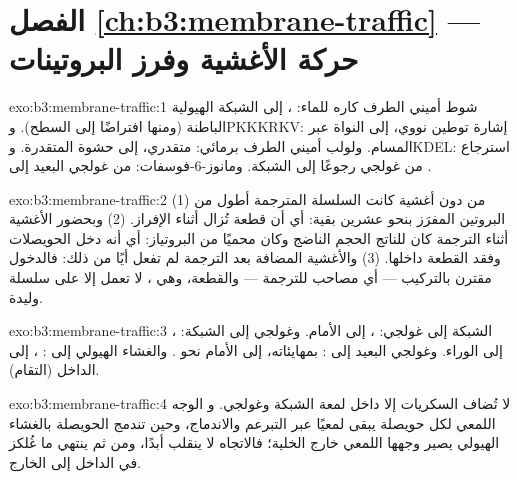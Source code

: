 \section*{الفصل \ref{ch:b3:membrane-traffic} --- حركة الأغشية وفرز البروتينات}

\begin{solution}{exo:b3:membrane-traffic:1}
شوط أميني الطرف كاره للماء: ، إلى
الشبكة الهيولية الباطنة (ومنها افتراضًا إلى السطح). وPKKKRKV:
إشارة توطين نووي، إلى النواة عبر المسام.
ولولب أميني الطرف برمائي:  متقدري، إلى
حشوة المتقدرة. وKDEL: استرجاع من غولجي رجوعًا إلى
الشبكة. ومانوز-6-فوسفات: من غولجي البعيد إلى 
.
\end{solution}

\begin{solution}{exo:b3:membrane-traffic:2}
(1) من دون أغشية كانت السلسلة المترجمة أطول من البروتين
المفرَز بنحو عشرين بقية: أي أن قطعة تُزال أثناء
الإفراز. (2) وبحضور الأغشية أثناء الترجمة كان للناتج
الحجم الناضج وكان محميًا من البروتياز: أي أنه دخل
الحويصلات وفقد القطعة داخلها. (3) والأغشية المضافة
بعد الترجمة لم تفعل أيًا من ذلك: فالدخول مقترن بالتركيب
--- أي مصاحب للترجمة --- والقطعة، وهي ، لا تعمل إلا
على سلسلة وليدة.
\end{solution}

\begin{solution}{exo:b3:membrane-traffic:3}
الشبكة إلى غولجي: ، إلى الأمام. وغولجي إلى الشبكة: ،
إلى الوراء. وغولجي البعيد إلى :  بمهايئاته،
إلى الأمام نحو . والغشاء الهيولي إلى : ،
إلى الداخل (التقام).
\end{solution}

\begin{solution}{exo:b3:membrane-traffic:4}
لا تُضاف السكريات إلا داخل لمعة الشبكة وغولجي. و
الوجه اللمعي لكل حويصلة يبقى لمعيًا عبر التبرعم والاندماج،
وحين تندمج الحويصلة بالغشاء الهيولي يصير وجهها اللمعي
خارج الخلية؛ فالاتجاه لا ينقلب أبدًا، ومن ثم
ينتهي ما غُلكز في الداخل إلى الخارج.
\end{solution}

